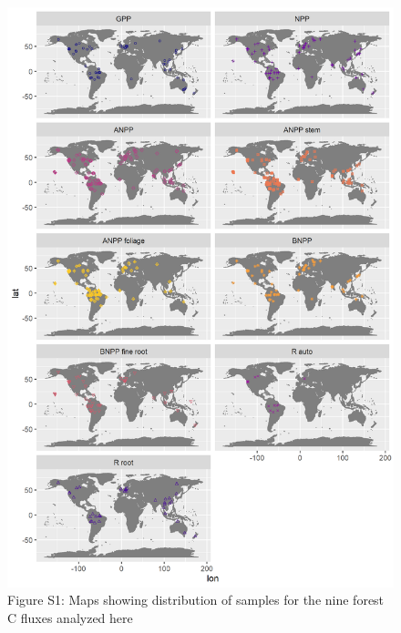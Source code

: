\documentclass[
]{article}
\begin{document}
\newpage
\begin{figure}[H]
\includegraphics[height=0.95\textheight]{tables_figures/distribution_all_samples} \caption{Figure S1: Maps showing distribution of samples for the nine forest C fluxes analyzed here}\label{fig:unnamed-chunk-9}
\end{figure}
\end{document}
